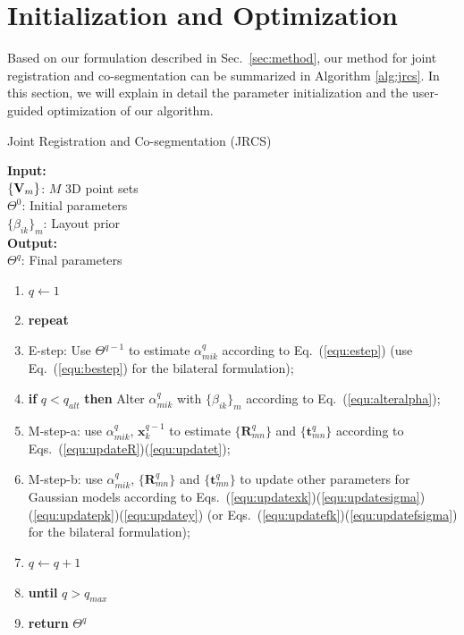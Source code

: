 \section{Initialization and Optimization}
\label{sec:imp}
Based on our formulation described in Sec.~\ref{sec:method}, our method for joint registration and co-segmentation can be summarized in Algorithm \ref{alg:jrcs}.
%
In this section, we will explain in detail the parameter initialization and the user-guided optimization of our algorithm.
\begin{algorithm}[htb]
	\caption{Joint Registration and Co-segmentation (JRCS)}
	\label{alg:jrcs}
	\textbf{Input:}~~\\  
	$\{\mathbf{V}_m\}$: $M$ 3D point sets\\
	$\Theta^0$: Initial parameters\\
	$\{\beta_{ik}\}_{m}$: Layout prior\\
	\textbf{Output:}~~\\
	$\Theta^q$: Final parameters~~
	\begin{enumerate}
		\item $q\leftarrow1$
		\item \textbf{repeat}
		\item E-step: Use $\Theta^{q-1}$ to estimate $\alpha_{mik}^q$ according to Eq.~(\ref{equ:estep}) (use Eq.~(\ref{equ:bestep}) for the bilateral formulation);
		\item \textbf{if} $q < q_{alt}$  \textbf{then} Alter $\alpha_{mik}^q$ with $\{\beta_{ik}\}_{m}$ according to Eq.~(\ref{equ:alteralpha});
		\item M-step-a: use $\alpha^q_{mik}$, $\mathbf x^{q-1}_k$ to estimate $\{\mathbf{R}_{mn}^q\}$ and $\{\mathbf t_{mn}^q\}$ according to Eqs.~(\ref{equ:updateR})(\ref{equ:updatet});
		\item M-step-b: use $\alpha^q_{mik}$, $\{\mathbf{R}_{mn}^q\}$ and $\{\mathbf{t}_{mn}^q\}$ to update other parameters for Gaussian models according to Eqs.~(\ref{equ:updatexk})(\ref{equ:updatesigma})(\ref{equ:updatepk})(\ref{equ:updatey})  (or Eqs.~(\ref{equ:updatefk})(\ref{equ:updatefsigma}) for the bilateral formulation);
		\item $q \leftarrow q+1$
		\item \textbf{until} $q > q_{max}$
		\item \textbf{return} $\Theta^q$
	\end{enumerate}
\end{algorithm}



